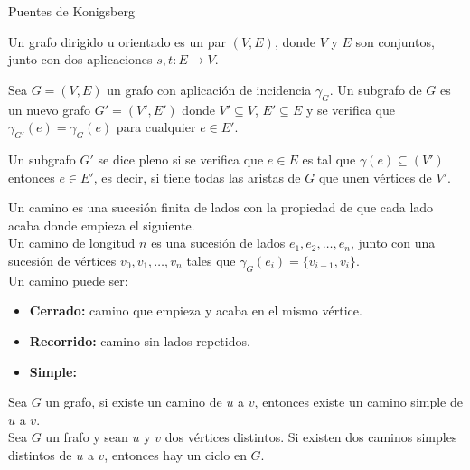 \begin{ejemplo}
    Puentes de Konigsberg
\end{ejemplo}

\begin{definicion}
    Un grafo dirigido u orientado es un par $(V,E)$, donde $V$ y $E$ son conjuntos, junto con dos aplicaciones $s,t:E \to V$.
\end{definicion}

\begin{definicion}
    Sea $G=(V,E)$ un grafo con aplicación de incidencia $\gamma_G$. Un subgrafo de $G$ es un nuevo grafo $G'=(V',E')$ donde $V'\subseteq V$, $E'\subseteq E$ y se verifica que $\gamma_{G'}(e) = \gamma_G(e)$ para cualquier $e\in E'$.
\end{definicion}

\begin{definicion}
    Un subgrafo $G'$ se dice pleno si se verifica que $e\in E$ es tal que $\gamma(e)\subseteq(V')$ entonces $e \in E'$, es decir, si tiene todas las aristas de $G$ que unen vértices de $V'$.
\end{definicion}

\begin{definicion}
    Un camino es una sucesión finita de lados con la propiedad de que cada lado acaba donde empieza el siguiente.\\

    Un camino de longitud $n$ es una sucesión de lados $e_1,e_2,\dots,e_n$, junto con una sucesión de vértices $v_0,v_1,\dots,v_n$ tales que $\gamma_G(e_i) = \{v_{i-1}, v_i\}$.\\

    Un camino puede ser:
    \begin{itemize}
        \item \textbf{Cerrado:} camino que empieza y acaba en el mismo vértice.
        \item \textbf{Recorrido:} camino sin lados repetidos.
        \item \textbf{Simple:}
    \end{itemize}
\end{definicion}

Sea $G$ un grafo, si existe un camino de $u$ a $v$, entonces existe un camino simple de $u$ a $v$.\\

Sea $G$ un frafo y sean $u$ y $v$ dos vértices distintos. Si existen dos caminos simples distintos de $u$ a $v$, entonces hay un ciclo en $G$.\\

